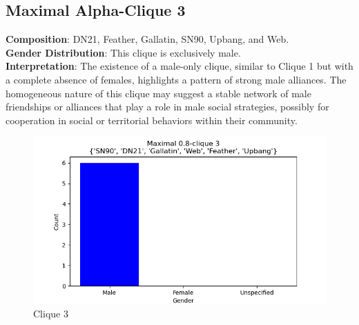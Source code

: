 \subsection{Maximal Alpha-Clique 3}
\textbf{Composition}: DN21, Feather, Gallatin, SN90, Upbang, and Web. \\
\textbf{Gender Distribution}: This clique is exclusively male. \\
\textbf{Interpretation}: The existence of a male-only clique, similar to Clique 1 but with a complete absence of females, highlights a pattern of strong male alliances. The homogeneous nature of this clique may suggest a stable network of male friendships or alliances that play a role in male social strategies, possibly for cooperation in social or territorial behaviors within their community.
\begin{figure}[H]
    \centering
    \includegraphics[width=1.0\textwidth]{imgs/clique_3.png}
    \caption{Clique 3}
    \label{fig:clique_3}
\end{figure}


